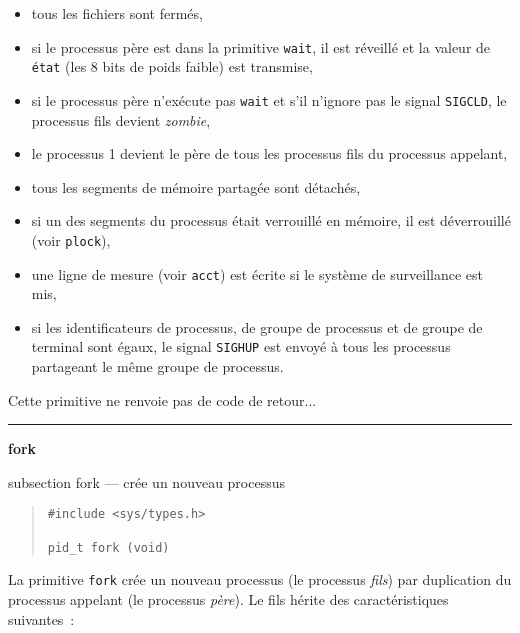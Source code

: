 \documentclass [twoside] {report}
\newcommand {\primitive} [1]
    {
	{\large \bf #1}
	\addcontentsline {toc} {subsection} {#1}
    }
\newcommand {\separation}
    {
	\vspace {7mm}
	\nopagebreak
	\hrule
    }
\begin{document}
\begin {itemize}
\item tous les fichiers sont fermés,
\item si le processus père est dans la primitive
{\tt wait}, il est réveillé et la valeur de {\tt état}
(les 8 bits de poids faible) est transmise,
\item si le processus père n'exécute pas {\tt wait} et
s'il n'ignore pas le signal {\tt SIGCLD}, le
processus fils devient {\it zombie},
\item le processus 1 devient le père de tous les
processus fils du processus appelant,
\item tous les segments de mémoire partagée sont
détachés,
\item si un des segments du processus était
verrouillé en mémoire, il est déverrouillé (voir
{\tt plock}),
\item une ligne de mesure (voir {\tt acct}) est écrite
si le système de surveillance est mis,
\item si les identificateurs de processus, de groupe
de processus et de groupe de terminal sont égaux,
le signal {\tt SIGHUP} est envoyé à tous les
processus partageant le même groupe de
processus.
\end {itemize}

Cette primitive ne renvoie pas de code de
retour...




\separation
\primitive {fork} --- crée un nouveau processus

\begin {quote}
\begin {verbatim}
#include <sys/types.h>

pid_t fork (void)
\end{verbatim}
\end {quote}

La primitive {\tt fork} crée un nouveau processus
(le processus {\it fils})
par duplication du processus appelant (le
processus {\it père}). Le fils hérite des
caractéristiques suivantes~:
\end{document}
